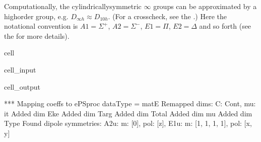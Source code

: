 \documentclass[letterpaper,table,10pt,english]{jupyterBook}
\begin{document}
\sphinxAtStartPar
Computationally, the cylindrically\sphinxhyphen{}symmetric \(\infty\) groups can be approximated by a high\sphinxhyphen{}order group, e.g. \(D_{\infty h} \approx D_{10h}\). (For a cross\sphinxhyphen{}check, see the .)  Here the notational convention is \(A1 = \Sigma^{+}\), \(A2 = \Sigma^{-}\), \(E1 = \Pi\), \(E2 = \Delta\) and so forth (see the  for more details).

\begin{sphinxuseclass}{cell}\begin{sphinxVerbatimInput}

\begin{sphinxuseclass}{cell_input}
\begin{sphinxVerbatim}[commandchars=\\\{\}]

   

  

  

\end{sphinxVerbatim}

\end{sphinxuseclass}\end{sphinxVerbatimInput}
\begin{sphinxVerbatimOutput}

\begin{sphinxuseclass}{cell_output}
\begin{sphinxVerbatim}[commandchars=\\\{\}]
*** Mapping coeffs to ePSproc dataType = matE
Remapped dims: \PYGZob{}\PYGZsq{}C\PYGZsq{}: \PYGZsq{}Cont\PYGZsq{}, \PYGZsq{}mu\PYGZsq{}: \PYGZsq{}it\PYGZsq{}\PYGZcb{}
Added dim Eke
Added dim Targ
Added dim Total
Added dim mu
Added dim Type
Found dipole symmetries: 
\PYGZob{}\PYGZsq{}A2u\PYGZsq{}: \PYGZob{}\PYGZsq{}m\PYGZsq{}: [0], \PYGZsq{}pol\PYGZsq{}: [\PYGZsq{}z\PYGZsq{}]\PYGZcb{}, \PYGZsq{}E1u\PYGZsq{}: \PYGZob{}\PYGZsq{}m\PYGZsq{}: [\PYGZhy{}1, 1, \PYGZhy{}1, 1], \PYGZsq{}pol\PYGZsq{}: [\PYGZsq{}x\PYGZsq{}, \PYGZsq{}y\PYGZsq{}]\PYGZcb{}\PYGZcb{}
\end{sphinxVerbatim}


\end{sphinxuseclass}
\end{sphinxVerbatimOutput}
\end{sphinxuseclass}
\end{document}
